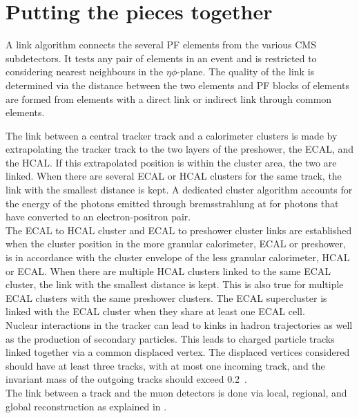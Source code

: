 \section{Putting the pieces together}
\label{sec:id}
A link algorithm connects the several PF elements from the various CMS subdetectors. It tests any pair of elements in an event and is restricted to considering nearest neighbours in the $\eta\phi$-plane. The quality of the link is determined via the distance between the two elements and PF blocks of elements are formed from elements with a direct link or indirect link through common elements. 


The link between a central tracker track and a calorimeter clusters is made by extrapolating the tracker track to the two layers of the preshower, the ECAL, and the HCAL. If this extrapolated position is within the cluster area, the two are linked. When there are several ECAL or HCAL clusters for the same track, the link with the smallest distance is kept. A dedicated cluster algorithm accounts for the energy of the photons emitted through bremsstrahlung at for photons that have converted to an electron-positron pair. \\The ECAL to HCAL cluster and ECAL to preshower cluster links are established when the cluster position in the more granular calorimeter, ECAL or preshower, is in accordance with the cluster envelope of the less granular calorimeter, HCAL or ECAL.  When there are multiple HCAL clusters linked to the same ECAL cluster, the link with the smallest distance is kept. This is also true for multiple ECAL clusters with the same preshower clusters. The ECAL supercluster is linked with the ECAL cluster when they share at least one ECAL cell. \\
Nuclear interactions in the tracker can lead to kinks in hadron trajectories as well as the production of secondary particles. This leads to charged particle tracks linked together via a common displaced vertex. The displaced vertices considered should have at least three tracks, with at most one incoming track, and the invariant mass of the outgoing tracks should exceed 0.2~\GeV. \\
The link between a track and the muon detectors is done via local, regional, and global reconstruction as explained in . 


